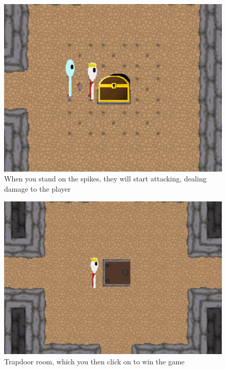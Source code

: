 \documentclass[../Main.tex]{subfiles}
\begin{document}
            \begin{figure}[hbt!]
                \centerline{\includegraphics[scale=0.4]{img/Testing/Objective/TrapRoomAttack.png}}
                \caption{When you stand on the spikes, they will start attacking, dealing damage to the player}
                \label{fig:TrapRoomAttack}
            \end{figure}
            \begin{figure}[hbt!]
                \centerline{\includegraphics[scale=0.4]{img/Testing/Objective/TrapDoorRoom.png}}
                \caption{Trapdoor room, which you then click on to win the game}
                \label{fig:TrapdoorRoom}
            \end{figure}
\end{document}
